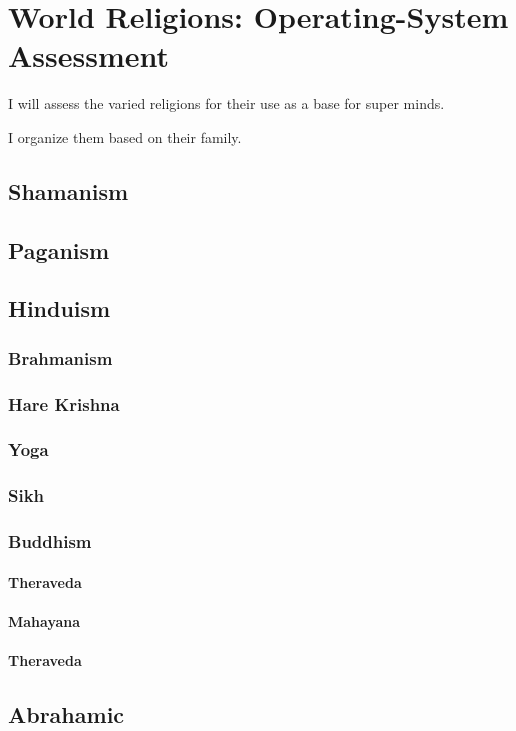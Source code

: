 \part{World Religions: Operating-System Assessment}
\label{worldreligions}

I will assess the varied religions for their use as a base for super minds.

I organize them based on their family.  

\chapter{Shamanism}
\chapter{Paganism}
\chapter{Hinduism}
\section{Brahmanism}
\section{Hare Krishna}
\section{Yoga}
\section{Sikh}
\section{Buddhism}
\subsection{Theraveda}
\subsection{Mahayana}
\subsection{Theraveda}
\chapter{Abrahamic}

